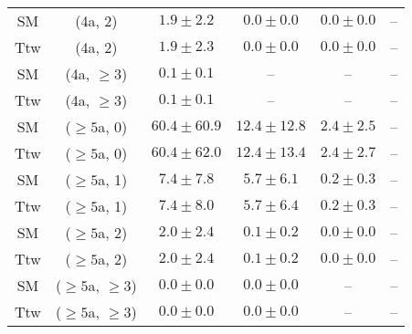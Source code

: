\begin{table}[h!]
{\begin{tabular}{cccccc}
	SM & (4a, 2) & $1.9\pm 2.2$ & $0.0\pm 0.0$ & $0.0\pm 0.0$ & -- \\[0.5ex] 
	Ttw & (4a, 2) & $1.9\pm 2.3$ & $0.0\pm 0.0$ & $0.0\pm 0.0$ & -- \\[0.5ex] 
	SM & (4a, $\ge3$) & $0.1\pm 0.1$ & -- & -- & -- \\[0.5ex] 
	Ttw & (4a, $\ge3$) & $0.1\pm 0.1$ & -- & -- & -- \\[0.5ex] 
	SM & ($\ge5$a, 0) & $60.4\pm 60.9$ & $12.4\pm 12.8$ & $2.4\pm 2.5$ & -- \\[0.5ex] 
	Ttw & ($\ge5$a, 0) & $60.4\pm 62.0$ & $12.4\pm 13.4$ & $2.4\pm 2.7$ & -- \\[0.5ex] 
	SM & ($\ge5$a, 1) & $7.4\pm 7.8$ & $5.7\pm 6.1$ & $0.2\pm 0.3$ & -- \\[0.5ex] 
	Ttw & ($\ge5$a, 1) & $7.4\pm 8.0$ & $5.7\pm 6.4$ & $0.2\pm 0.3$ & -- \\[0.5ex] 
	SM & ($\ge5$a, 2) & $2.0\pm 2.4$ & $0.1\pm 0.2$ & $0.0\pm 0.0$ & -- \\[0.5ex] 
	Ttw & ($\ge5$a, 2) & $2.0\pm 2.4$ & $0.1\pm 0.2$ & $0.0\pm 0.0$ & -- \\[0.5ex] 
	SM & ($\ge5$a, $\ge3$) & $0.0\pm 0.0$ & $0.0\pm 0.0$ & -- & -- \\[0.5ex] 
	Ttw & ($\ge5$a, $\ge3$) & $0.0\pm 0.0$ & $0.0\pm 0.0$ & -- & -- \\[0.5ex] 
	\hline
	\hline
\end{tabular}}
\end{table}
